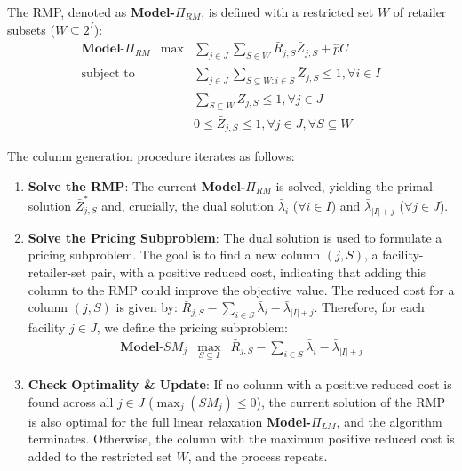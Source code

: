 \documentclass[]{article}
\theoremstyle{plain}%
\theoremstyle{definition}
\theoremstyle{remark}
\theoremstyle{plain}%
\begin{document}
    The RMP, denoted as \textbf{Model-}$\Pi_{RM}$, is defined with a restricted set $W$ of retailer subsets ($W \subseteq 2^I$):
    \begin{align}
    \label{model5}
    & \textbf{Model-} \Pi_{RM} & \max    & \sum_{j\in J} \sum_{S\in W}\bar{R}_{j,S}\bar{Z}_{j,S}+\hat{p}C  &\\
    & \mbox{subject to} && \sum_{j\in J}\sum_{S\subseteq W:i\in S} \bar{Z}_{j,S} \leq 1, \forall{i\in I} &\\
    &&& \sum_{S\subseteq W} \bar{Z}_{j,S} \leq 1,   \forall{j\in J} &\\
    &&& 0 \leq \bar{Z}_{j,S} \leq 1 ,  \forall{j\in J}, \forall{S\subseteq W} &
    \end{align}
    
    The column generation procedure iterates as follows:
    \begin{enumerate}
    \item\textbf{Solve the RMP}: The current \textbf{Model-}$\Pi_{RM}$ is solved, yielding the primal solution $\bar{Z}^*_{j,S}$ and, crucially, the dual solution $\bar{\lambda}_i$ ($\forall i \in I$) and $\bar{\lambda}_{|I|+j}$ ($\forall j \in J$).
    
    \item\textbf{Solve the Pricing Subproblem}: The dual solution is used to formulate a pricing subproblem. The goal is to find a new column $(j, S)$, a facility-retailer-set pair, with a positive reduced cost, indicating that adding this column to the RMP could improve the objective value. The reduced cost for a column $(j, S)$ is given by:
    $\bar{R}_{j,S} - \sum_{i\in S}\bar{\lambda}_i - \bar{\lambda}_{|I|+j}$.
    Therefore, for each facility $j \in J$, we define the pricing subproblem:
    \begin{align}
    \label{model6}
    & \textbf{Model-} SM_{j} & \max_{S\subseteq I}    & \bar{R}_{j,S}-\sum_{i\in S}\bar{\lambda}_i-\bar{\lambda}_{|I|+j}  &
    \end{align}
    
    
    \item\textbf{Check Optimality \& Update}: If no column with a positive reduced cost is found across all $j \in J$ ($\max_j(SM_j) \leq 0$), the current solution of the RMP is also optimal for the full linear relaxation \textbf{Model-}$\Pi_{LM}$, and the algorithm terminates. Otherwise, the column with the maximum positive reduced cost is added to the restricted set $W$, and the process repeats.
    \end{enumerate}
    
\end{document}

